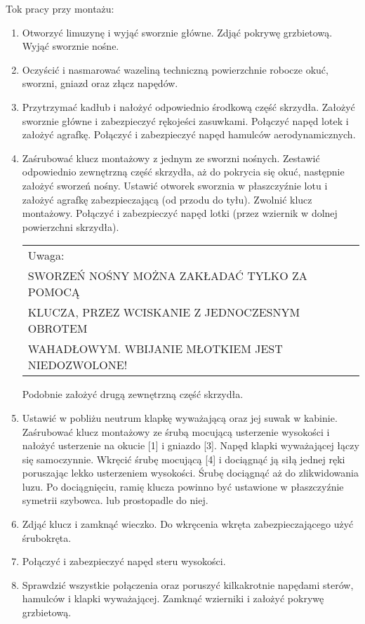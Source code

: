 \documentclass{article}
\begin{document}
\noindent
Tok pracy przy montażu:
\begin{enumerate}
\item Otworzyć limuzynę i wyjąć sworznie główne. Zdjąć pokrywę
   grzbietową. Wyjąć sworznie nośne.
\item Oczyścić i nasmarować wazeliną techniczną powierzchnie robocze okuć,
   sworzni, gniazd oraz złącz napędów.
\item Przytrzymać kadłub i nałożyć odpowiednio środkową część skrzydła.
   Założyć sworznie główne i zabezpieczyć rękojeści zasuwkami. Połączyć
   napęd lotek i założyć agrafkę. Połączyć i zabezpieczyć napęd hamulców
   aerodynamicznych.
\item Zaśrubować klucz montażowy z jednym ze sworzni nośnych. Zestawić
   odpowiednio zewnętrzną część skrzydła, aż do pokrycia się okuć,
   następnie założyć sworzeń nośny. Ustawić otworek sworznia w
   płaszczyźnie lotu i założyć agrafkę zabezpieczającą (od przodu do tyłu).
   Zwolnić klucz montażowy. Połączyć i zabezpieczyć napęd lotki
   (przez wziernik w dolnej powierzchni skrzydła). \\
\begin{tabular}{|l|}
\hline
Uwaga: \\
  SWORZEŃ NOŚNY MOŻNA ZAKŁADAĆ TYLKO ZA POMOCĄ \\
  KLUCZA, PRZEZ WCISKANIE Z JEDNOCZESNYM OBROTEM \\
  WAHADŁOWYM. WBIJANIE MŁOTKIEM JEST NIEDOZWOLONE!\\
\hline
\end{tabular}

   Podobnie założyć drugą zewnętrzną część skrzydła.
\item Ustawić w pobliżu neutrum klapkę wyważającą oraz jej suwak w
   kabinie. Zaśrubować klucz montażowy ze śrubą mocującą usterzenie
   wysokości i nałożyć usterzenie na okucie [1] i gniazdo [3]. Napęd klapki
   wyważającej łączy się samoczynnie. Wkręcić śrubę mocującą [4] i
   dociągnąć ją siłą jednej ręki poruszając lekko usterzeniem wysokości.
   Śrubę dociągnąć aż do zlikwidowania luzu. Po dociągnięciu, ramię
   klucza powinno być ustawione w płaszczyźnie symetrii szybowca. lub
   prostopadle do niej.
\item Zdjąć klucz i zamknąć wieczko. Do wkręcenia wkręta zabezpieczającego
   użyć śrubokręta.
\item Połączyć i zabezpieczyć napęd steru wysokości.
\item Sprawdzić wszystkie połączenia oraz poruszyć kilkakrotnie napędami
   sterów, hamulców i klapki wyważającej. Zamknąć wzierniki i założyć
   pokrywę grzbietową.
\end{enumerate}
\end{document}
